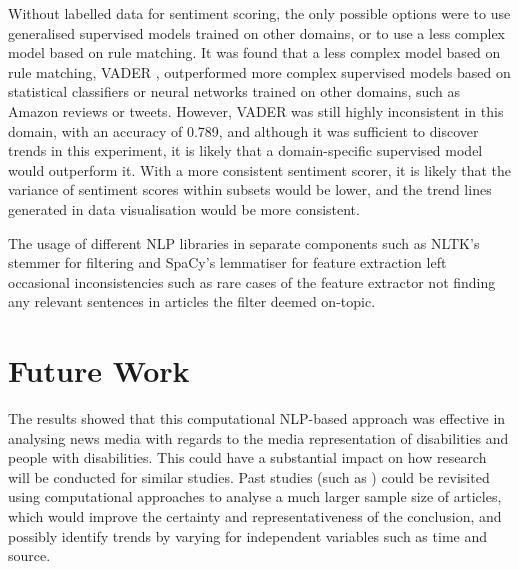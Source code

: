 \documentclass{report}
\begin{document}
Without labelled data for sentiment scoring, the only possible options were to use generalised supervised models trained on other domains, or to use a less complex model based on rule matching.
It was found that a less complex model based on rule matching, VADER \cite{VADER}, outperformed more complex supervised models based on statistical classifiers or neural networks trained on other domains, such as Amazon reviews or tweets.
However, VADER was still highly inconsistent in this domain, with an accuracy of 0.789, and although it was sufficient to discover trends in this experiment, it is likely that a domain-specific supervised model would outperform it.
With a more consistent sentiment scorer, it is likely that the variance of sentiment scores within subsets would be lower, and the trend lines generated in data visualisation would be more consistent.

The usage of different NLP libraries in separate components such as NLTK's stemmer for filtering and SpaCy's lemmatiser for feature extraction left occasional inconsistencies such as rare cases of the feature extractor not finding any relevant sentences in articles the filter deemed on-topic.

\section{Future Work} \label{Future Work}

The results showed that this computational NLP-based approach was effective in analysing news media with regards to the media representation of disabilities and people with disabilities.
This could have a substantial impact on how research will be conducted for similar studies.
Past studies (such as \cite{gold1999media, coverdale2002depictions, jones2009representations, devotta2013representations}) could be revisited using computational approaches to analyse a much larger sample size of articles, which would improve the certainty and representativeness of the conclusion, and possibly identify trends by varying for independent variables such as time and source.
\end{document}
